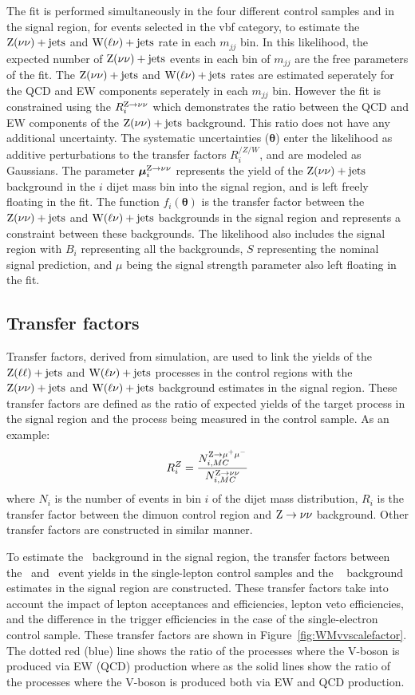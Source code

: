 The fit is performed simultaneously in the four different control samples and in the signal 
region, for events selected in the vbf category, to estimate the $\mathrm{Z}(\nu\nu)+\textrm{jets}$ and $\mathrm{W}(\ell\nu)+\textrm{jets}$ rate
in each $m_{jj}$ bin. In this likelihood, the expected number of $\mathrm{Z}(\nu\nu)+\textrm{jets}$ events in each 
bin of $m_{jj}$ are the free parameters of the fit. 
The $\mathrm{Z}(\nu\nu)+\textrm{jets}$ and $\mathrm{W}(\ell\nu)+\textrm{jets}$ rates are estimated seperately for the 
QCD and EW components seperately in each $m_{jj}$ bin. However the fit is constrained using the $R^{\mathrm{\mathrm{Z}\to\nu\nu}}_{i}$ which 
demonstrates the ratio between the QCD and EW components of the $\mathrm{Z}(\nu\nu)+\textrm{jets}$ background. This ratio does not have any additional 
uncertainty.
The systematic uncertainties ($\boldsymbol{\theta}$) 
enter the likelihood as additive perturbations to the transfer factors $R^{/Z/W}_{i}$, and are modeled as Gaussians.
The parameter $\boldsymbol{\mu}_{i}^{\mathrm{Z}\to\nu\nu}$ represents the yield of the $\mathrm{Z}(\nu\nu)+\textrm{jets}$ background in the $i$ dijet mass 
bin into the signal region, and is left freely floating in the fit. The function $f_{i}(\boldsymbol{\theta})$ is the 
transfer factor between the $\mathrm{Z}(\nu\nu)+\textrm{jets}$ and $\mathrm{W}(\ell\nu)+\textrm{jets}$ backgrounds in the signal region and represents a constraint between 
these backgrounds. The likelihood also includes the signal region  with $B_{i}$ representing all the backgrounds, $S$ 
representing the nominal signal prediction, and $\mu$ being the signal strength parameter also left floating in the fit. 

\subsection{Transfer factors}

Transfer factors, derived from simulation, 
are used to link the yields of the $\mathrm{Z}(\ell\ell)+\textrm{jets}$ and $\mathrm{W}(\ell\nu)+\textrm{jets}$ processes in the control
regions with the $\mathrm{Z}(\nu\nu)+\textrm{jets}$ and $\mathrm{W}(\ell\nu)+\textrm{jets}$ background estimates in the signal region.
These transfer factors are defined as the ratio of expected yields of the target process
in the signal region and the process being measured in the control sample. As an example:
\begin{equation}
R_{i}^{Z} = \frac{N_{i,MC}^{\mathrm{Z}\to\mu^+\mu^-}}{N_{i,MC}^{\mathrm{Z}\to\nu\nu}} 
\end{equation}
where $N_{i}$ is the number of events in bin $i$ of the dijet mass distribution, $R_{i}$ is the transfer factor between the dimuon control region and $\mathrm{Z}\to\nu\nu$ background. 
Other transfer factors are constructed in similar manner. 

To estimate the \Wlvjets~background in the signal region, the transfer factors between
the \Wmvjets~and \Wevjets~event yields in the single-lepton control samples and
the \Wlvjets~ background estimates in the signal region are constructed. These transfer factors take into account 
the impact of lepton acceptances and efficiencies, lepton veto efficiencies, and
the difference in the trigger efficiencies in the case of the single-electron control sample. 
These transfer factors
are shown in Figure~\ref{fig:WMvvscalefactor}. The dotted red (blue) line shows the ratio of the processes where the V-boson
is produced via EW (QCD) production where as the solid lines show the ratio of the processes where the V-boson is produced both
via EW and QCD production.


